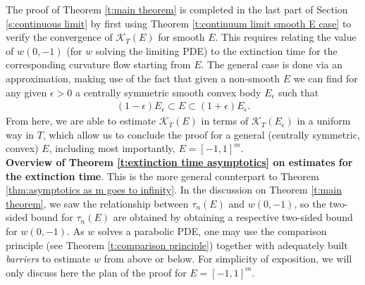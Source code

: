 \documentclass[reqno]{amsart}
\numberwithin{equation}{section}
\begin{document}
The proof of Theorem \ref{t:main theorem} is completed in the last part of Section \ref{s:continuous limit} by first using Theorem \ref{t:continuum limit smooth E case} to verify the convergence of $\mathcal{K}_T(E)$ for smooth $E$. This requires relating the value of $w(0,-1)$ (for $w$ solving the limiting PDE) to the extinction time for the corresponding curvature flow starting from $E$. The general case is done via an approximation, making use of the fact that given a non-smooth $E$ we can find for any given $\epsilon>0$ a centrally symmetric smooth convex body $E_\epsilon$ such that 
\begin{align*}
  (1-\epsilon) E_\epsilon \subset E \subset (1+\epsilon)E_\epsilon.   
\end{align*}
From here, we are able to estimate $\mathcal{K}_T(E)$ in terms of $\mathcal{K}_T(E_\epsilon)$ in a uniform way in $T$, which allow us to conclude the proof for a general (centrally symmetric, convex) $E$, including most importantly, $E=[-1,1]^m$.\\


\noindent \textbf{Overview of Theorem \ref{t:extinction time asymptotics} on estimates for the extinction time}. This is the more general counterpart to Theorem \ref{thm:asymptotics as m goes to infinity}. In the discussion on Theorem \ref{t:main theorem}, we saw the relationship between $\tau_n(E)$ and $w(0,-1)$, so the two-sided bound for $\tau_n(E)$ are obtained by obtaining a respective two-sided bound for $w(0,-1)$. As $w$ solves a parabolic PDE, one may use the comparison principle (see Theorem \ref{t:comparison principle}) together with adequately built \emph{barriers} to estimate $w$ from above or below. For simplicity of exposition, we will only discuss here the plan of the proof for $E=[-1,1]^m$.
\end{document}
